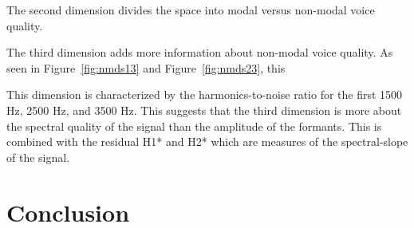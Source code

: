 The second dimension divides the space into modal versus non-modal voice quality.

The third dimension adds more information about non-modal voice quality. As seen in Figure~\ref{fig:nmds13} and Figure~\ref{fig:nmds23}, this 

This dimension is characterized by the harmonics-to-noise ratio for the first 1500 Hz, 2500 Hz, and 3500 Hz. This suggests that the third dimension is more about the spectral quality of the signal than the amplitude of the formants. This is combined with the residual H1* and H2* which are measures of the spectral-slope of the signal.
\section{Conclusion} \label{sec:acousticlandscape:conclusion}

